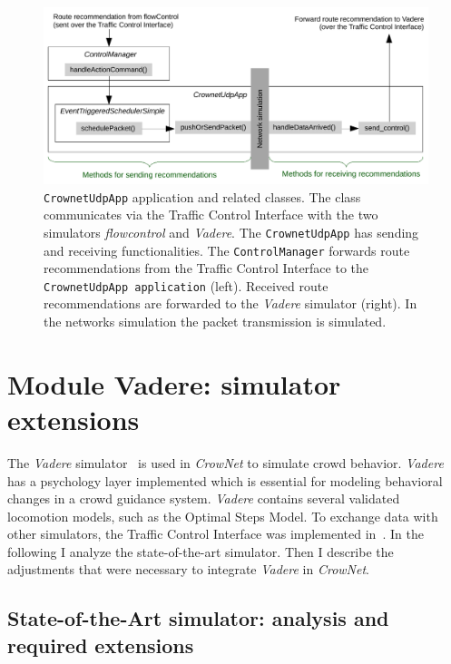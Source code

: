 \begin{figure}[hbt!]
\includegraphics[width=\textwidth]{../figures/crownet/crownetapp.pdf} 
\caption{\lstinline{CrownetUdpApp} application and related classes. The class communicates via the Traffic Control Interface with the two simulators \textit{flowcontrol} and \textit{Vadere}. The \lstinline{CrownetUdpApp} has sending and receiving functionalities. The \lstinline{ControlManager} forwards route recommendations from the Traffic Control Interface to the \lstinline{CrownetUdpApp application} (left). Received route recommendations are forwarded to the \textit{Vadere} simulator (right). In the networks simulation the packet transmission is simulated.}
\label{fig:udpappcrownet}
\end{figure}




\section{Module Vadere: simulator extensions}

\label{sec:vadere}
The \textit{Vadere} simulator~\cite{kleinmeier-2019-cdyn} is used in \textit{CrowNet} to simulate crowd behavior. \textit{Vadere} has a psychology layer implemented which is essential for modeling  behavioral changes in a crowd guidance system. \textit{Vadere} contains several validated locomotion models, such as the Optimal Steps Model. To exchange data with other simulators, the Traffic Control Interface was implemented in~\cite{schuhbaeck-2019-com}. In the following I analyze the state-of-the-art simulator. Then I describe the adjustments that were necessary to integrate \textit{Vadere} in \textit{CrowNet}.


\subsection{State-of-the-Art simulator: analysis and required extensions}

